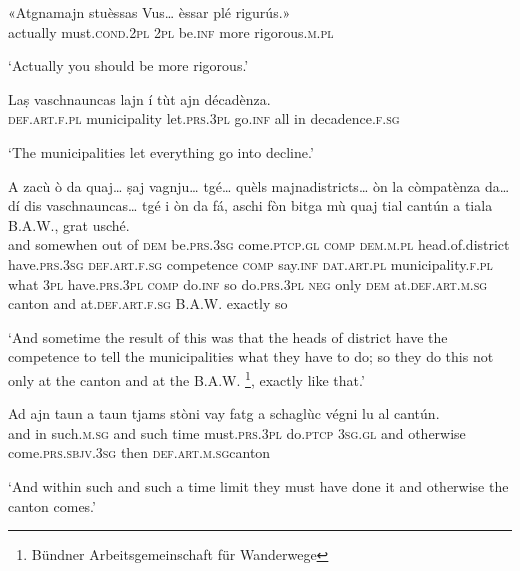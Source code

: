 \begin{linenumbers}
\gll «Atgnamajn stuèssas Vus… èssar plé rigurús.»   \\
actually must.\textsc{cond.2pl} \textsc{2pl} be.\textsc{inf} more rigorous.\textsc{m.pl}  \\
\end{linenumbers}
\medskip
\glt `Actually you should be more rigorous.'
\medskip

\begin{linenumbers}
\gll Laṣ vaschnauncas lajn í tùt ajn décadènza.   \\
 \textsc{def.art.f.pl} municipality let.\textsc{prs.3pl} go.\textsc{inf} all in decadence.\textsc{f.sg}  \\
\end{linenumbers}
\medskip
\glt `The municipalities let everything go into decline.'
\medskip

\begin{linenumbers}
\gll A zacù ò da quaj… ṣaj vagnju… tgé… quèls majnadistricts… òn la còmpatènza da… dí dis vaschnauncas… tgé i òn da fá, aschi fòn bitga mù quaj tial cantún a tiala B.A.W., grat usché.\\
and somewhen out of \textsc{dem} be.\textsc{prs.3sg} come.\textsc{ptcp.gl} \textsc{comp}  \textsc{dem.m.pl} head.of.district have.\textsc{prs.3sg} \textsc{def.art.f.sg} competence \textsc{comp} say.\textsc{inf}  \textsc{dat.art.pl} municipality.\textsc{f.pl} what \textsc{3pl} have.\textsc{prs.3pl}  \textsc{comp} do.\textsc{inf} so do.\textsc{prs.3pl} \textsc{neg} only  \textsc{dem} at.\textsc{def.art.m.sg} canton and  at.\textsc{def.art.f.sg} B.A.W. exactly so \\
\end{linenumbers}
\medskip
\glt `And sometime the result of this was that the heads of district have the competence to tell the municipalities what they have to do; so they do this not only at the canton and at the B.A.W. \footnote{Bündner Arbeitsgemeinschaft für Wanderwege}, exactly like that.'
\medskip

\begin{linenumbers}
\gll Ad ajn taun a taun tjams stòni vay fatg a schaglùc végni lu al cantún.\\
and in such.\textsc{m.sg} and such time must.\textsc{prs.3pl} do.\textsc{ptcp} \textsc{3sg.gl} and otherwise come.\textsc{prs.sbjv.3sg} then \textsc{def.art.m.sg}canton\\
\end{linenumbers}
\medskip
\glt `And within such and such a time limit they must have done it and otherwise the canton comes.'
\medskip

